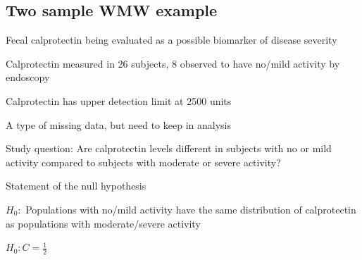\subsection{Two sample WMW example}
\bi 
\item Fecal calprotectin being evaluated as a possible biomarker of
  disease severity 
\item Calprotectin measured in 26 subjects, 8 observed to have no/mild
  activity by endoscopy 
\item Calprotectin has upper detection limit at 2500 units
 \bi 
 \item A type of missing data, but need to keep in analysis
 \ei
\item Study question: Are calprotectin levels different in subjects
  with no or mild activity compared to subjects with moderate or
  severe activity? 
\item Statement of the null hypothesis
 \bi 
 \item $H_0:$ Populations with no/mild activity have the same
   distribution of calprotectin as populations with moderate/severe
   activity 
 \item $H_0: C = \frac{1}{2}$
 \ei
\ei
